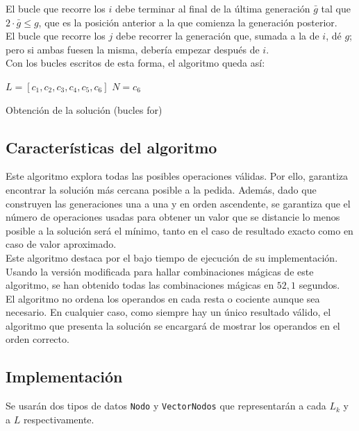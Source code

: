 El bucle que recorre los $i$ debe terminar al final de la última generación $\bar g$ tal que $2\cdot \bar g \le g$, que es la posición anterior a la que comienza la generación posterior. \\

El bucle que recorre los $j$ debe recorrer la generación que, sumada a la de $i$, dé $g$; pero si ambas fuesen la misma, debería empezar después de $i$. \\

Con los bucles escritos de esta forma, el algoritmo queda así:

\begin{algorithm}[H]
	
	$L = [c_1, c_2, c_3, c_4, c_5, c_6]$\;
	$N = c_6$\;
	\caption{Obtención de la solución (bucles for)}
\end{algorithm}

\subsection{Características del algoritmo}
Este algoritmo explora todas las posibles operaciones válidas.
Por ello, garantiza encontrar la solución más cercana posible a la pedida.
Además, dado que construyen las generaciones una a una y en orden ascendente,
se garantiza que el número de operaciones usadas para obtener un valor que se
distancie lo menos posible a la solución será el mínimo, tanto en el caso de
resultado exacto como en caso de valor aproximado.\\

Este algoritmo destaca por el bajo tiempo de ejecución de su implementación. Usando la versión modificada para hallar combinaciones mágicas de este algoritmo, se han obtenido todas las combinaciones mágicas en $52,1$ segundos.\\

El algoritmo no ordena los operandos en cada resta o cociente aunque sea necesario.
En cualquier caso, como siempre hay un único resultado válido, el algoritmo que
presenta la solución se encargará de mostrar los operandos en el orden correcto.

\subsection{Implementación}

Se usarán dos tipos de datos \texttt{Nodo} y \texttt{VectorNodos} que representarán a cada $L_k$ y a $L$ respectivamente.


